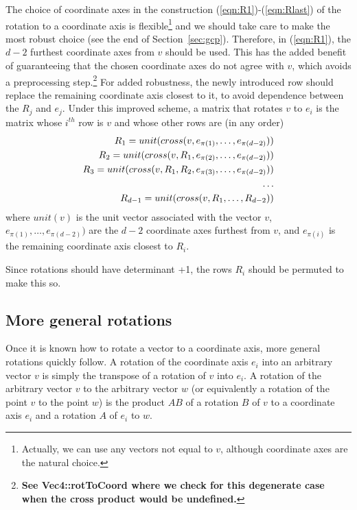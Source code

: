 \documentclass[10pt]{article}
\begin{document}
The choice of coordinate axes in the construction (\ref{eqn:R1})-(\ref{eqn:Rlast})
of the rotation to a coordinate axis is flexible\footnote{Actually, we 
  can use any vectors not equal to $v$, although coordinate axes are the 
  natural choice.}
and we should take care to make the most robust choice (see the end of 
Section~\ref{sec:gcp}).
Therefore, in (\ref{eqn:R1}), 
the $d-2$ furthest coordinate axes from $v$ should be used.
This has the added benefit of guaranteeing that the chosen coordinate axes
do not agree with $v$, which avoids a preprocessing step.\footnote{{\bf See
    Vec4::rotToCoord where we check for this degenerate case 
    when the cross product would be undefined.}}
For added robustness, the newly introduced row should replace the remaining 
coordinate axis closest to it, to avoid dependence between the $R_j$ and $e_j$.
Under this improved scheme, a matrix that rotates $v$ to $e_i$ is the matrix
whose $i^{th}$ row is $v$ and whose other rows are (in any order)
\begin{eqnarray}
R_1 = unit(cross (v,e_{\pi(1)},         \ldots,e_{\pi(d-2)})) \\
R_2 = unit(cross (v,R_1,e_{\pi(2)},     \ldots,e_{\pi(d-2)})) \\
R_3 = unit(cross (v,R_1,R_2,e_{\pi(3)}, \ldots,e_{\pi(d-2)})) \\
\ldots \hfill \\
R_{d-1} = unit(cross (v,R_1,\ldots,R_{d-2}))
\end{eqnarray}
where $unit(v)$ is the unit vector associated with the vector $v$,
$e_{\pi(1)},\ldots,e_{\pi(d-2)})$ are the $d-2$ coordinate axes furthest from $v$,
and $e_{\pi(i)}$ is the remaining coordinate axis closest to $R_i$.

Since rotations should have determinant +1, %
the rows $R_i$ should be permuted to make this so.

\subsection{More general rotations}

Once it is known how to rotate a vector to a coordinate axis, more general
rotations quickly follow.
A rotation of the coordinate axis $e_i$ into an arbitrary vector $v$
is simply the transpose of a rotation of $v$ into $e_i$.
A rotation of the arbitrary vector $v$ to the arbitrary vector $w$ 
(or equivalently a rotation of the point $v$ to the point $w$)
is the product $AB$ of a rotation $B$ of $v$ to a coordinate axis $e_i$ 
and a rotation $A$ of $e_i$ to $w$.
\end{document}
